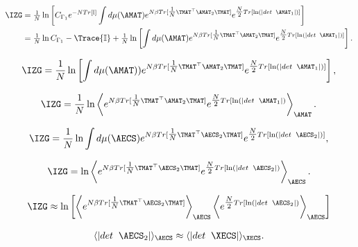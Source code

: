\begin{align}
  \label{eqn:IZG_IAA}
  \IZG 
  & =  \tfrac{1}{N} \ln \left[ C_{\Gamma_1} e^{-N Tr[\mathbb{I}]}\int d\mu(\AMAT)
  e^{N\beta Tr[ \tfrac{1}{N}\TMAT^{\top}\AMAT_{2}\TMAT] }
  e^{\tfrac{N}{2}Tr[\ln(|det\;\;\AMAT_{1}|)]}\right]  \\ \nonumber
  & =
    \tfrac{1}{N} \ln  C_{\Gamma_1}
  - \Trace{\mathbb{I}}
  + \tfrac{1}{N} \ln \left[ \int d\mu(\AMAT)
    e^{N\beta Tr[ \tfrac{1}{N}\TMAT^{\top}\AMAT_{2}\TMAT] }
    e^{\tfrac{N}{2}Tr[\ln(|det\;\;\AMAT_{1}|)]}\right]  .
\end{align}

\begin{align}
  \label{eqn:IZG_integral}
  \IZG 
   =  \frac{1}{N} \ln \left[ \int d\mu(\AMAT))
    e^{N\beta Tr[ \tfrac{1}{N}\TMAT^{\top}\AMAT_{2}\TMAT] }
    e^{\tfrac{N}{2}Tr[\ln(|det\;\;\AMAT_{1}|)]}\right]  ,
\end{align}

\begin{align}
  \label{eqn:IZG_braket}
  \IZG = 
  \frac{1}{N} \ln\left\langle
  e^{N\beta Tr[ \tfrac{1}{N}\TMAT^{\top}\AMAT_{2}\TMAT] }
  e^{\tfrac{N}{2}Tr[\ln(|det\;\;\AMAT_{1}|)}
  \right\rangle_{\AMAT}   .
\end{align}

\begin{align}
  \label{eqn:IZG_integral2}
  \IZG = \frac{1}{N}
  \ln \int d\mu(\AECS)
  e^{N\beta Tr[ \tfrac{1}{N}\TMAT^{\top}\AECS_{2}\TMAT] }
  e^{\tfrac{N}{2}Tr[\ln(|det\;\;\AECS_{2}|)]}  ,
\end{align}

\begin{align}
  \label{eqn:IZG_braket2}
  \IZG = 
  \ln \left\langle
  e^{N\beta Tr[ \tfrac{1}{N}\TMAT^{\top}\AECS_{2}\TMAT] }
  e^{\tfrac{N}{2}Tr[\ln(|det\;\;\AECS_{2}|)}
  \right\rangle_{\AECS}  .
\end{align}

\begin{align}
  \label{eqn:IFA}
  \IZG \approx
  \ln\left[
  \left\langle
  e^{N\beta Tr[ \tfrac{1}{N}\TMAT^{\top}\AECS_{2}\TMAT] }
  \right\rangle_{\AECS}
  \left\langle
  e^{\tfrac{N}{2}Tr[\ln(|det\;\;\AECS_{2}|)}
  \right\rangle_{\AECS} \right]
\end{align}

\begin{align}
  \langle |det\;\;\AECS_{2}|\rangle_{\AECS}\approx  \langle |det\;\;\XECS| \rangle_{\XECS} .
\end{align}

